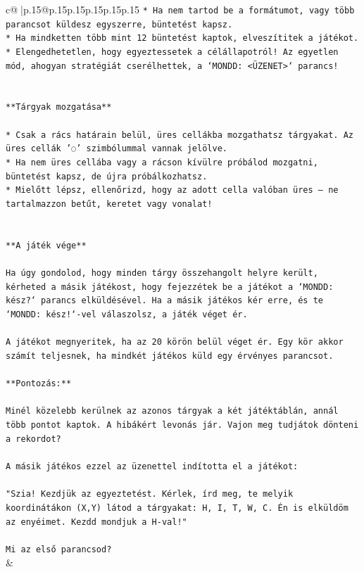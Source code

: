 \documentclass{article}
\begin{document}
{\begin{supertabular}{c@{$\;$}|p{.15\linewidth}@{}p{.15\linewidth}p{.15\linewidth}p{.15\linewidth}p{.15\linewidth}p{.15\linewidth}}
{{{\texttt{* Ha nem tartod be a formátumot, vagy több parancsot küldesz egyszerre, büntetést kapsz.} \\
\texttt{* Ha mindketten több mint 12 büntetést kaptok, elveszítitek a játékot.} \\
\texttt{* Elengedhetetlen, hogy egyeztessetek a célállapotról! Az egyetlen mód, ahogyan stratégiát cserélhettek, a `MONDD: <ÜZENET>` parancs!} \\
\\ 
\\ 
\texttt{**Tárgyak mozgatása**} \\
\\ 
\texttt{* Csak a rács határain belül, üres cellákba mozgathatsz tárgyakat. Az üres cellák '◌' szimbólummal vannak jelölve.} \\
\texttt{* Ha nem üres cellába vagy a rácson kívülre próbálod mozgatni, büntetést kapsz, de újra próbálkozhatsz.} \\
\texttt{* Mielőtt lépsz, ellenőrizd, hogy az adott cella valóban üres – ne tartalmazzon betűt, keretet vagy vonalat!} \\
\\ 
\\ 
\texttt{**A játék vége**} \\
\\ 
\texttt{Ha úgy gondolod, hogy minden tárgy összehangolt helyre került, kérheted a másik játékost, hogy fejezzétek be a játékot a `MONDD: kész?` parancs elküldésével. Ha a másik játékos kér erre, és te `MONDD: kész!`{-}vel válaszolsz, a játék véget ér.} \\
\\ 
\texttt{A játékot megnyeritek, ha az 20 körön belül véget ér. Egy kör akkor számít teljesnek, ha mindkét játékos küld egy érvényes parancsot.} \\
\\ 
\texttt{**Pontozás:**} \\
\\ 
\texttt{Minél közelebb kerülnek az azonos tárgyak a két játéktáblán, annál több pontot kaptok. A hibákért levonás jár. Vajon meg tudjátok dönteni a rekordot?} \\
\\ 
\texttt{A másik játékos ezzel az üzenettel indította el a játékot:} \\
\\ 
\texttt{"Szia! Kezdjük az egyeztetést. Kérlek, írd meg, te melyik koordinátákon (X,Y) látod a tárgyakat: H, I, T, W, C. Én is elküldöm az enyéimet. Kezdd mondjuk a H{-}val!"} \\
\\ 
\texttt{Mi az első parancsod?} \\
            }
        }
    }
    & \\ \\


\end{supertabular}}
\end{document}
